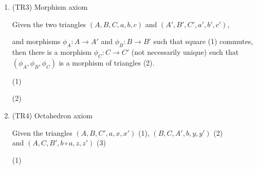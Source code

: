 \begin{definition}
\begin{enumerate}
\begin{center}
                \end{center}
            \item (TR3) Morphism axiom
            
                Given the two triangles $(A,B,C,a,b,c)$ and $(A',B',C',a',b',c')$,
                \begin{center}
                \end{center}
                and morphisms $\phi_A : A \rightarrow A'$ and $\phi_B : B \rightarrow B'$ such that square (1) commutes, then there is a morphism $\phi_C : C \rightarrow C'$ (not necessarily unique) such that $(\phi_A ,\phi_B ,\phi_C)$ is a morphism of triangles (2).
                
                \begin{center}
                    (1)
                    (2)
                \end{center}
            \item (TR4) Octahedron axiom
            
                Given the triangles $(A,B,C',a,x,x')$ (1), $(B,C,A',b,y,y')$ (2) \\ and $(A,C,B',b\circ a,z,z')$ (3)
                \begin{center}
                    (1)


\end{center}
\end{enumerate}
\end{definition}

